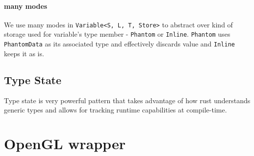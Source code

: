 \paragraph{many modes}

We use many modes in \texttt{Variable<S, L, T, Store>} to abstract over kind of storage used for variable's type member - \texttt{Phantom} or \texttt{Inline}.
\texttt{Phantom} uses \texttt{PhantomData} as its associated type and effectively discards value and \texttt{Inline} keeps it as is.

\subsection{Type State}

Type state is very powerful pattern that takes advantage of how rust understands generic types and allows for tracking runtime capabilities at compile-time. 

\section{OpenGL wrapper}
  
